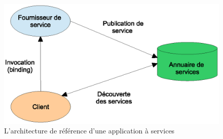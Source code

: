 \begin{figure}[h]
    \centering
    \includegraphics[width=1\textwidth]{figs/ws-basic-arch.eps}
    \caption{L'architecture de référence d'une application à services}
    \label{fig:ws-basic-arch}
\end{figure}


